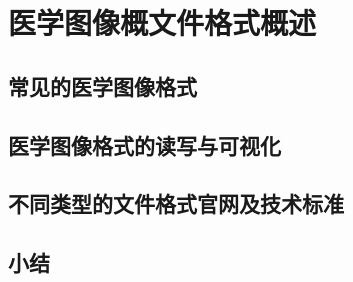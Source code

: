 

\chapter{医学图像概文件格式概述}
\section{常见的医学图像格式}
\section{医学图像格式的读写与可视化}
\section{不同类型的文件格式官网及技术标准}
\section{小结}